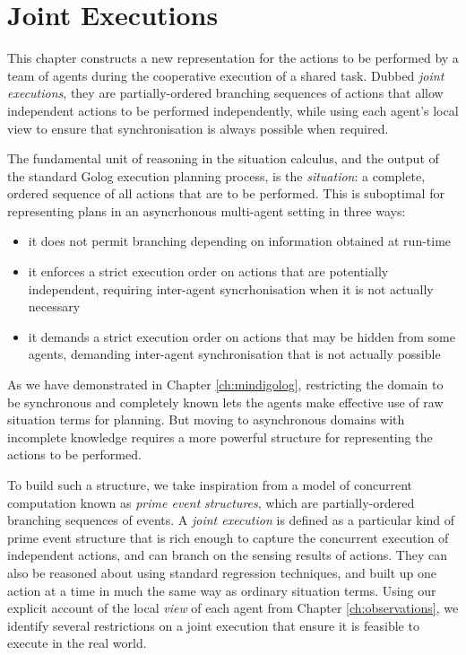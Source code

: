 

\chapter{Joint Executions}

\label{ch:jointexec}

This chapter constructs a new representation for the actions to be
performed by a team of agents during the cooperative execution of
a shared task. Dubbed \emph{joint executions}, they are partially-ordered
branching sequences of actions that allow independent actions to be
performed independently, while using each agent's local view to ensure
that synchronisation is always possible when required.

The fundamental unit of reasoning in the situation calculus, and the
output of the standard Golog execution planning process, is the \emph{situation}:
a complete, ordered sequence of all actions that are to be performed.
This is suboptimal for representing plans in an asyncrhonous multi-agent
setting in three ways:

\begin{itemize}
\item it does not permit branching depending on information obtained at
run-time 
\item it enforces a strict execution order on actions that are potentially
independent, requiring inter-agent syncrhonisation when it is not
actually necessary 
\item it demands a strict execution order on actions that may be hidden
from some agents, demanding inter-agent synchronisation that is not
actually possible 
\end{itemize}
As we have demonstrated in Chapter \ref{ch:mindigolog}, restricting
the domain to be synchronous and completely known lets the agents
make effective use of raw situation terms for planning. But moving
to asynchronous domains with incomplete knowledge requires a more
powerful structure for representing the actions to be performed.

To build such a structure, we take inspiration from a model of concurrent
computation known as \emph{prime event} \emph{structures}, which are
partially-ordered branching sequences of events. A \emph{joint execution}
is defined as a particular kind of prime event structure that is rich
enough to capture the concurrent execution of independent actions,
and can branch on the sensing results of actions. They can also be
reasoned about using standard regression techniques, and built up
one action at a time in much the same way as ordinary situation terms.
Using our explicit account of the local \emph{view} of each agent
from Chapter \ref{ch:observations}, we identify several restrictions
on a joint execution that ensure it is feasible to execute in the
real world.

